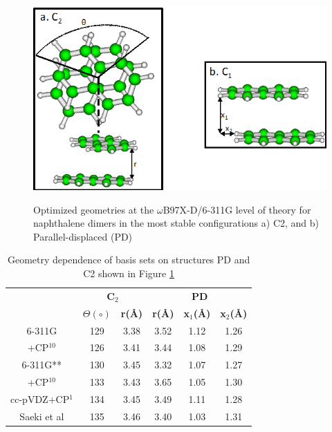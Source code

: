 \begin{figure}[h]
	\centering
	\includegraphics[scale=0.5]{image/napthalene-dimer} \label{fig5d}
	\caption[Optimized geometries for naphthalene dimers]{Optimized geometries at the $\omega$B97X-D/6-311G level of theory for naphthalene dimers in the most stable configurations a) C2, and b) Parallel-displaced (PD)}
\end{figure}


\begin{table}[H]
	\caption{Geometry dependence of basis sets on structures PD and C2 shown in Figure \ref{fig5d}}
	\begin{center}
		\begin{tabular}{c c c c c c}
			\toprule
			 & \multicolumn{2}{p{4cm}}{\centering \textbf{C$_{2}$}} & \multicolumn{3}{p{6cm}}{\centering \textbf{PD}}\\
			  & \textbf{$\Theta(\circ)$} & \textbf{r(\AA)} & \textbf{r(\AA)} & \textbf{x$_{1}$(\AA)} & \textbf{x$_{2}$(\AA)}\\
			  \midrule
			  6-311G & 129 & 3.38 & 3.52 & 1.12 & 1.26\\
			  +CP$^{10}$ & 126  & 3.41 & 3.44 & 1.08 & 1.29\\	  
			  6-311G** & 130 & 3.45 & 3.32 & 1.07 & 1.27\\
			  +CP$^{10}$ & 133 & 3.43 & 3.65 & 1.05 & 1.30\\
			  cc-pVDZ+CP$^{1}$ & 134 & 3.45 & 3.49 & 1.11 & 1.28\\
			  Saeki et al\cite{saeki2006theoretical} & 135 & 3.46 & 3.40 & 1.03 &  1.31\\
			  \bottomrule
		\end{tabular}
	\end{center}
	\label{table5}
\end{table}


